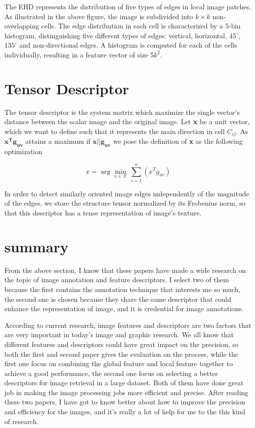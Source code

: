 \documentclass[pdftex,12pt,a4paper]{article}
\begin{document}
The EHD represents the distribution of five types of edges in
local image patches. As illustrated in the above figure, the image is subdivided
into $k \times k$ non-overlapping cells. The edge distribution in each cell
is characterized by a 5-bin histogram, distinguishing five different
types of edges: vertical, horizontal, $45^{\circ}$, $135^{\circ}$ and non-directional edges. 
A histogram is computed for each of the cells individually, resulting in a feature vector of size 5$k^{2}$.


\section{Tensor Descriptor}
The tensor descriptor is the system matrix which maximize the single vector's distance between the scalar image and the original image.
Let \textbf{x} be a unit vector, which we want to define such that it represents the main direction in cell $C_{ij}$.
As $\bm{x^{T}g_{uv}}$ attains a maximum if $\bm{x||g_{uv}}$ we pose the definition of \textbf{x} as the following optimization

\begin{displaymath}{x}=\arg\underset{x\in\mathcal{X}}{\min}\,{\sum_{i=1}^{n}}(x^{T}g_{uv})
\end{displaymath}

In order to detect similarly oriented image edges independently of the magnitude of the edges, we store the structure
tensor normalized by its Frobenius norm, so that this descriptor has a tense representation of image's texture.


\section{summary}
From the above section, I know that these papers have made a wide research on the topic of image annotation and feature
descriptors. I select two of them because the first contains the annotation technique that interests me so much, the second
one is chosen because they share the same descriptor that could enhance the representation of image, and it is credential for
image annotations.

According to current research, image features and descriptors are two factors that are very important in today's image and
graphic research. We all know that different features and descriptors could have great impact on the precision, so both the
first and second paper gives the evaluation on the process, while the first one focus on combining the global feature and local feature together to achieve a good performance, the second one focus on selecting a better descriptors for image retrieval in a large dataset. Both of them have done great job in making the image processing jobs more efficient and precise. After reading these two papers, I have got to know better about how to improve the precision and efficiency for
the images, and it's really a lot of help for me to the this kind of research.
\end{document}
